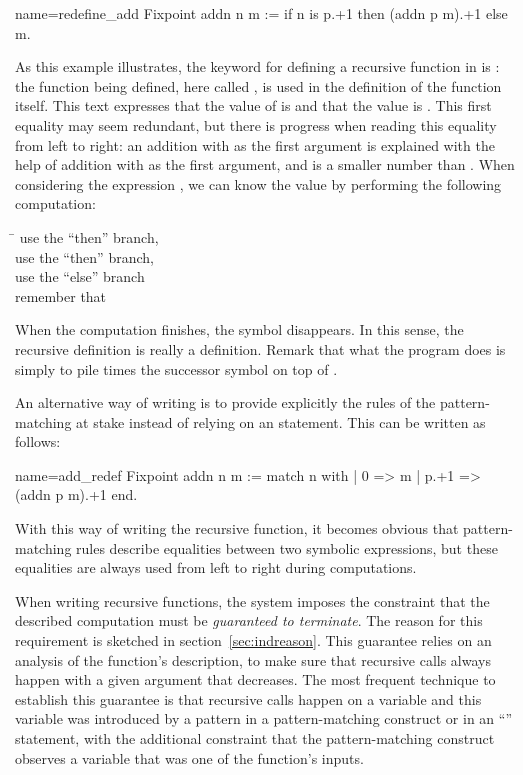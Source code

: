 \begin{coq}{name=redefine_add}{}
Fixpoint addn n m :=
  if n is p.+1 then (addn p m).+1 else m.
\end{coq}
As this example illustrates, the keyword for defining a recursive
function in \Coq{} is : the function being
defined, here called , is used in the definition of the
function  itself.  This text expresses that the value of
 is
 and that the value  is .
This first equality may
seem redundant, but there is progress when reading this equality from
left to right: an addition with  as the first argument
is explained with the help of addition with  as the first
argument, and  is a smaller number than .  When considering the
expression , we can know the value by performing the following
computation:
\begin{tabbing}
\=\kill
{} \> use the ``then'' branch, \\
 \> use the ``then'' branch, \\
 \> use the ``else'' branch\\
\> remember that 
\end{tabbing}
When the computation finishes, the symbol  disappears.  In
this sense, the recursive definition is really a definition.  Remark that
what the  program does is simply to pile  times the
successor symbol on top of .

An alternative way of writing  is to provide explicitly the
rules of the pattern-matching at stake instead of relying on an 
statement. This can be written as follows:

\begin{coq}{name=add_redef}{}
Fixpoint addn n m :=
  match n with
  | 0 => m
  | p.+1 => (addn p m).+1
  end.
\end{coq}
With this way of writing the recursive function, it becomes obvious that
pattern-matching rules describe equalities between two symbolic
expressions, but these equalities are always used from left to right during
computations.

When writing recursive functions, the \Coq{} system imposes the
constraint that the described computation must be \emph{guaranteed to
terminate}.  The reason for this requirement is sketched in
section~\ref{sec:indreason}.
This guarantee relies on an analysis of the function's
description, to make sure that recursive calls always happen with a
given argument that decreases.  The most frequent technique to
establish this guarantee is that recursive calls happen on a variable
and this variable was introduced by a pattern in a pattern-matching
construct or in an ``'' statement, with the additional
constraint that the pattern-matching construct observes a variable
that was one of the function's inputs.

